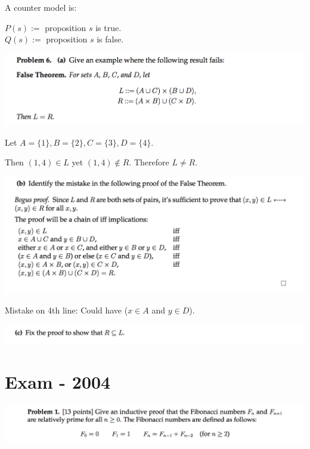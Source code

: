 \documentclass[12pt]{article}
\begin{document}
A counter model is:

$P(s) := $ proposition $s$ is true.\\
$Q(s) := $ proposition $s$ is false.


\begin{mdframed}
\includegraphics[width=400pt]{img/MIT-math-for-cs-2005-set-1-6-a.png}
\end{mdframed}
Let $A = \{1\}, B = \{2\}, C = \{3\}, D=\{4\}$.

Then $(1,4) \in L$ yet $(1,4) \notin R$. Therefore $L \neq R$.

\begin{mdframed}
\includegraphics[width=400pt]{img/MIT-math-for-cs-2005-set-1-6-b.png}
\end{mdframed}
Mistake on 4th line: Could have ($x \in A$ and $y \in D$).
\newpage



\begin{mdframed}
\includegraphics[width=400pt]{img/MIT-math-for-cs-2005-set-1-6-c.png}
\end{mdframed}

\newpage

\section*{Exam - 2004}

\begin{mdframed}
\includegraphics[width=400pt]{img/MIT-math-for-cs-2004-1.png}
\end{mdframed}
\end{document}
